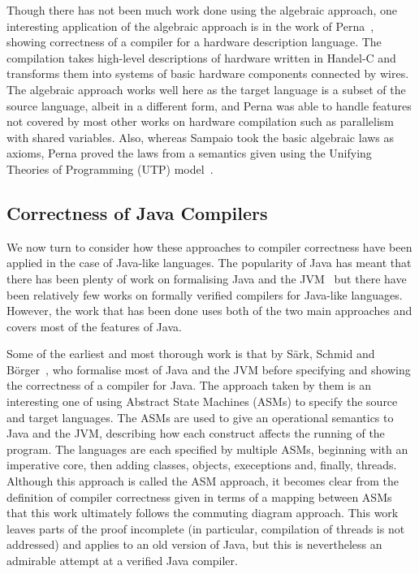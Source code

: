 \documentclass[a4paper,10pt]{report}
\begin{document}
Though there has not been much work done using the algebraic approach, one
interesting application of the algebraic approach is in the work of
Perna~\cite{perna2010, perna2011}, showing correctness of a compiler for a
hardware description language.  The compilation takes high-level descriptions of
hardware written in Handel-C and transforms them into systems of basic hardware
components connected by wires.  The algebraic approach works well here as the
target language is a subset of the source language, albeit in a different form,
and Perna was able to handle features not covered by most other works on
hardware compilation such as parallelism with shared variables.  Also, whereas
Sampaio took the basic algebraic laws as axioms, Perna proved the laws from a
semantics given using the Unifying Theories of Programming (UTP)
model~\cite{hoare1998}.

\subsection{Correctness of Java Compilers}
\label{java-compiler-correctness-subsection}

We now turn to consider how these approaches to compiler correctness have been
applied in the case of Java-like languages.  The popularity of Java has meant
that there has been plenty of work on formalising Java and the
JVM~\cite{hartel2001} but there have been relatively few works on formally
verified compilers for Java-like languages.  However, the work that has been
done uses both of the two main approaches and covers most of the features of
Java.

Some of the earliest and most thorough work is that by S\"{a}rk, Schmid and
B\"{o}rger~\cite{stark2001}, who formalise most of Java and the JVM before
specifying and showing the correctness of a compiler for Java.  The approach
taken by them is an interesting one of using Abstract State Machines (ASMs) to
specify the source and target languages.  The ASMs are used to give an
operational semantics to Java and the JVM, describing how each construct affects
the running of the program.  The languages are each specified by multiple ASMs,
beginning with an imperative core, then adding classes, objects, execeptions
and, finally, threads.  Although this approach is called the ASM
approach, it becomes clear from the definition of compiler correctness given in
terms of a mapping between ASMs that this work ultimately follows the commuting
diagram approach.  This work leaves parts of the proof incomplete (in
particular, compilation of threads is not addressed) and applies to an old
version of Java, but this is nevertheless an admirable attempt at a verified
Java compiler.
\end{document}

